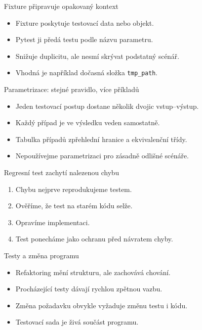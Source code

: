 \documentclass[aspectratio=169]{beamer}
\begin{document}
\begin{frame}{Fixture připravuje opakovaný kontext}
\begin{itemize}
\item Fixture poskytuje testovací data nebo objekt.
\item Pytest ji předá testu podle názvu parametru.
\item Snižuje duplicitu, ale nesmí skrývat podstatný scénář.
\item Vhodná je například dočasná složka \texttt{tmp\_path}.
\end{itemize}
\end{frame}

\begin{frame}{Parametrizace: stejné pravidlo, více příkladů}
\begin{itemize}
\item Jeden testovací postup dostane několik dvojic vstup--výstup.
\item Každý případ je ve výsledku veden samostatně.
\item Tabulka případů zpřehlední hranice a ekvivalenční třídy.
\item Nepoužívejme parametrizaci pro zásadně odlišné scénáře.
\end{itemize}
\end{frame}

\begin{frame}{Regresní test zachytí nalezenou chybu}
\begin{enumerate}
\item Chybu nejprve reprodukujeme testem.
\item Ověříme, že test na starém kódu selže.
\item Opravíme implementaci.
\item Test ponecháme jako ochranu před návratem chyby.
\end{enumerate}
\end{frame}

\begin{frame}{Testy a změna programu}
\begin{itemize}
\item Refaktoring mění strukturu, ale zachovává chování.
\item Procházející testy dávají rychlou zpětnou vazbu.
\item Změna požadavku obvykle vyžaduje změnu testu i kódu.
\item Testovací sada je živá součást programu.
\end{itemize}
\end{frame}
\end{document}
